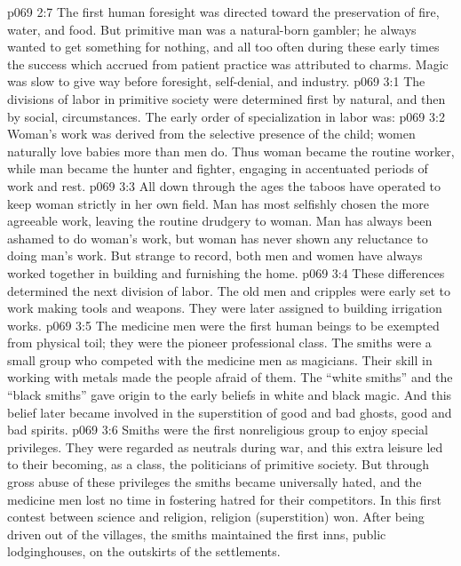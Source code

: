 \vs p069 2:7 The first human foresight was directed toward the preservation of fire, water, and food. But primitive man was a natural\hyp{}born gambler; he always wanted to get something for nothing, and all too often during these early times the success which accrued from patient practice was attributed to charms. Magic was slow to give way before foresight, self\hyp{}denial, and industry.
\vs p069 3:1 The divisions of labor in primitive society were determined first by natural, and then by social, circumstances. The early order of specialization in labor was:\plusone
\pc \vs p069 3:2 \bibnobreakspace {} Woman’s work was derived from the selective presence of the child; women naturally love babies more than men do. Thus woman became the routine worker, while man became the hunter and fighter, engaging in accentuated periods of work and rest.
\pc \vs p069 3:3 All down through the ages the taboos have operated to keep woman strictly in her own field. Man has most selfishly chosen the more agreeable work, leaving the routine drudgery to woman. Man has always been ashamed to do woman’s work, but woman has never shown any reluctance to doing man’s work. But strange to record, both men and women have always worked together in building and furnishing the home.
\pc \vs p069 3:4 \bibnobreakspace {} These differences determined the next division of labor. The old men and cripples were early set to work making tools and weapons. They were later assigned to building irrigation works.
\pc \vs p069 3:5 \bibnobreakspace {} The medicine men were the first human beings to be exempted from physical toil; they were the pioneer professional class. The smiths were a small group who competed with the medicine men as magicians. Their skill in working with metals made the people afraid of them. The “white smiths” and the “black smiths” gave origin to the early beliefs in white and black magic. And this belief later became involved in the superstition of good and bad ghosts, good and bad spirits.
\vs p069 3:6 Smiths were the first nonreligious group to enjoy special privileges. They were regarded as neutrals during war, and this extra leisure led to their becoming, as a class, the politicians of primitive society. But through gross abuse of these privileges the smiths became universally hated, and the medicine men lost no time in fostering hatred for their competitors. In this first contest between science and religion, religion (superstition) won. After being driven out of the villages, the smiths maintained the first inns, public lodginghouses, on the outskirts of the settlements.
